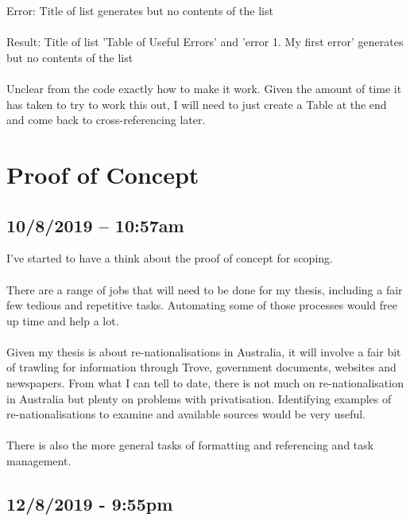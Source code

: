 \documentclass{article}
\begin{document}
Error: Title of list generates but no contents of the list\\\\
Result: Title of list 'Table of Useful Errors' and 'error 1. My first error' generates but no contents of the list\\\\

Unclear from the code exactly how to make it work. Given the amount of time it has taken to try to work this out, I will need to just create a Table at the end and come back to cross-referencing later.

\newpage
\section{Proof of Concept}
\subsection*{10/8/2019 – 10:57am}
I’ve started to have a think about the proof of concept for scoping.\\\\
There are a range of jobs that will need to be done for my thesis, including a fair few tedious and repetitive tasks. Automating some of those processes would free up time and help a lot.\\\\
Given my thesis is about re-nationalisations in Australia, it will involve a fair bit of trawling for information through Trove, government documents, websites and newspapers. From what I can tell to date, there is not much on re-nationalisation in Australia but plenty on problems with privatisation. Identifying examples of re-nationalisations to examine and available sources would be very useful.\\\\
There is also the more general tasks of formatting and referencing and task management.

\subsection*{12/8/2019 - 9:55pm}
\end{document}
